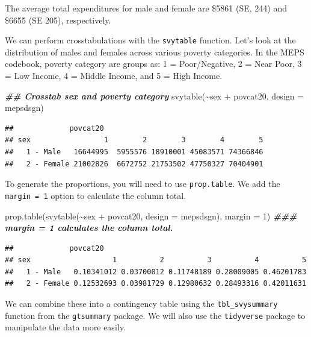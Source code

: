 \documentclass[
]{book}
\newenvironment{Shaded}{\begin{snugshade}}{\end{snugshade}}
\newcommand{\AttributeTok}[1]{\textcolor[rgb]{0.77,0.63,0.00}{#1}}
\newcommand{\DecValTok}[1]{\textcolor[rgb]{0.00,0.00,0.81}{#1}}
\newcommand{\DocumentationTok}[1]{\textcolor[rgb]{0.56,0.35,0.01}{\textbf{\textit{#1}}}}
\newcommand{\FunctionTok}[1]{\textcolor[rgb]{0.00,0.00,0.00}{#1}}
\newcommand{\NormalTok}[1]{#1}
\newcommand{\SpecialCharTok}[1]{\textcolor[rgb]{0.00,0.00,0.00}{#1}}
\begin{document}
The average total expenditures for male and female are \$5861 (SE, 244) and \$6655 (SE 205), respectively.

We can perform crosstabulations with the \texttt{svytable} function. Let's look at the distribution of males and females across various poverty categories. In the MEPS codebook, poverty category are groups as: 1 = Poor/Negative, 2 = Near Poor, 3 = Low Income, 4 = Middle Income, and 5 = High Income.

\begin{Shaded}
\begin{Highlighting}[]
\DocumentationTok{\#\# Crosstab sex and poverty category}
\FunctionTok{svytable}\NormalTok{(}\SpecialCharTok{\textasciitilde{}}\NormalTok{sex }\SpecialCharTok{+}\NormalTok{ povcat20, }\AttributeTok{design =}\NormalTok{ mepsdsgn)}
\end{Highlighting}
\end{Shaded}

\begin{verbatim}
##             povcat20
## sex                 1        2        3        4        5
##   1 - Male   16644995  5955576 18910001 45083571 74366846
##   2 - Female 21002826  6672752 21753502 47750327 70404901
\end{verbatim}

To generate the proportions, you will need to use \texttt{prop.table}. We add the \texttt{margin\ =\ 1} option to calculate the column total.

\begin{Shaded}
\begin{Highlighting}[]
\FunctionTok{prop.table}\NormalTok{(}\FunctionTok{svytable}\NormalTok{(}\SpecialCharTok{\textasciitilde{}}\NormalTok{sex }\SpecialCharTok{+}\NormalTok{ povcat20, }\AttributeTok{design =}\NormalTok{ mepsdsgn), }\AttributeTok{margin =} \DecValTok{1}\NormalTok{) }\DocumentationTok{\#\#\# margin = 1 calculates the column total.}
\end{Highlighting}
\end{Shaded}

\begin{verbatim}
##             povcat20
## sex                   1          2          3          4          5
##   1 - Male   0.10341012 0.03700012 0.11748189 0.28009005 0.46201783
##   2 - Female 0.12532693 0.03981729 0.12980632 0.28493316 0.42011631
\end{verbatim}

We can combine these into a contingency table using the \texttt{tbl\_svysummary} function from the \texttt{gtsummary} package. We will also use the \texttt{tidyverse} package to manipulate the data more easily.
\end{document}
